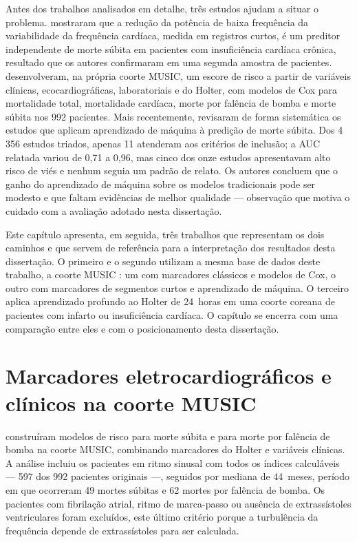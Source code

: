 Antes dos trabalhos analisados em detalhe, três estudos ajudam a situar o
problema.  mostraram que a redução da potência
de baixa frequência da variabilidade da frequência cardíaca, medida em
registros curtos, é um preditor independente de morte súbita em pacientes
com insuficiência cardíaca crônica, resultado que os autores confirmaram em
uma segunda amostra de pacientes. 
desenvolveram, na própria coorte MUSIC, um escore de risco a partir de
variáveis clínicas, ecocardiográficas, laboratoriais e do Holter, com
modelos de Cox para mortalidade total, mortalidade cardíaca, morte por
falência de bomba e morte súbita nos 992 pacientes. Mais recentemente,
 revisaram de forma sistemática os estudos
que aplicam aprendizado de máquina à predição de morte súbita. Dos 4\,356
estudos triados, apenas 11 atenderam aos critérios de inclusão; a \gls{AUC}
relatada variou de 0,71 a 0,96, mas cinco dos onze estudos apresentavam alto
risco de viés e nenhum seguia um padrão de relato. Os autores concluem que o
ganho do aprendizado de máquina sobre os modelos tradicionais pode ser
modesto e que faltam evidências de melhor qualidade --- observação que
motiva o cuidado com a avaliação adotado nesta dissertação.

Este capítulo apresenta, em seguida, três trabalhos que representam os dois
caminhos e que servem de referência para a interpretação dos resultados
desta dissertação.
O primeiro e o segundo utilizam a mesma base de dados deste trabalho, a
coorte MUSIC \cite{martinyebra2024music}: um com marcadores clássicos e
modelos de Cox, o outro com marcadores de segmentos curtos e aprendizado de
máquina. O terceiro aplica aprendizado profundo ao Holter de 24~horas em uma
coorte coreana de pacientes com infarto ou insuficiência cardíaca. O
capítulo se encerra com uma comparação entre eles e com o posicionamento
desta dissertação.

\section{Marcadores eletrocardiográficos e clínicos na coorte MUSIC}
\label{sec:trab-ramirez}

 construíram modelos de risco para morte
súbita e para morte por falência de bomba na coorte MUSIC, combinando
marcadores do Holter e variáveis clínicas. A análise incluiu os pacientes em
ritmo sinusal com todos os índices calculáveis --- 597 dos 992 pacientes
originais ---, seguidos por mediana de 44~meses, período em que ocorreram
49 mortes súbitas e 62 mortes por falência de bomba. Os pacientes com
fibrilação atrial, ritmo de marca-passo ou ausência de extrassístoles
ventriculares foram excluídos, este último critério porque a turbulência da
frequência depende de extrassístoles para ser calculada.

